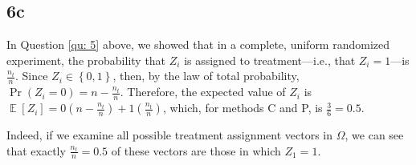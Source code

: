 \documentclass[
  12pt,
  leqno]{article}
\DeclareMathOperator{\E}{\mathbb{E}}
\begin{document}
\subsection*{6c}

In Question \ref{qu: 5} above, we showed that in a complete, uniform
randomized experiment, the probability that \(Z_i\) is assigned to
treatment---i.e., that \(Z_i = 1\)---is \(\frac{n_t}{n}\). Since
\(Z_i \in \left\{0, 1\right\}\), then, by the law of total probability,
\(\Pr\left(Z_i = 0\right) = n - \frac{n_t}{n}\). Therefore, the expected
value of \(Z_i\) is
\(\E\left[Z_i\right] = 0\left(n - \frac{n_t}{n}\right) + 1 \left(\frac{n_t}{n}\right)\),
which, for methods C and P, is \(\frac{3}{6} = 0.5\).

Indeed, if we examine all possible treatment assignment vectors in
\(\Omega\), we can see that exactly \(\frac{n_t}{n} = 0.5\) of these
vectors are those in which \(Z_1 = 1\).
\end{document}
